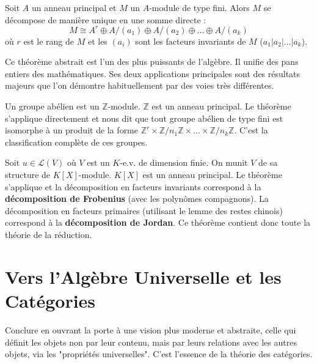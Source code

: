 \begin{theorem}
    Soit $A$ un anneau principal et $M$ un $A$-module de type fini. Alors $M$ se décompose de manière unique en une somme directe :
    $$ M \cong A^r \oplus A/(a_1) \oplus A/(a_2) \oplus \dots \oplus A/(a_k) $$
    où $r$ est le rang de $M$ et les $(a_i)$ sont les facteurs invariants de $M$ ($a_1 | a_2 | \dots | a_k$).
\end{theorem}

\begin{remark}
    Ce théorème abstrait est l'un des plus puissants de l'algèbre. Il unifie des pans entiers des mathématiques. Ses deux applications principales sont des résultats majeurs que l'on démontre habituellement par des voies très différentes.
\end{remark}

\begin{application}
    Un groupe abélien est un $\mathbb{Z}$-module. $\mathbb{Z}$ est un anneau principal. Le théorème s'applique directement et nous dit que tout groupe abélien de type fini est isomorphe à un produit de la forme $\mathbb{Z}^r \times \mathbb{Z}/n_1\mathbb{Z} \times \dots \times \mathbb{Z}/n_k\mathbb{Z}$. C'est la classification complète de ces groupes.
\end{application}

\begin{application}
    Soit $u \in \mathcal{L}(V)$ où $V$ est un $K$-e.v. de dimension finie. On munit $V$ de sa structure de $K[X]$-module. $K[X]$ est un anneau principal. Le théorème s'applique et la décomposition en facteurs invariants correspond à la \textbf{décomposition de Frobenius} (avec les polynômes compagnons). La décomposition en facteurs primaires (utilisant le lemme des restes chinois) correspond à la \textbf{décomposition de Jordan}. Ce théorème contient donc toute la théorie de la réduction.
\end{application}

\section{Vers l'Algèbre Universelle et les Catégories}

\begin{objectif}
    Conclure en ouvrant la porte à une vision plus moderne et abstraite, celle qui définit les objets non par leur contenu, mais par leurs relations avec les autres objets, via les "propriétés universelles". C'est l'essence de la théorie des catégories.
\end{objectif}

